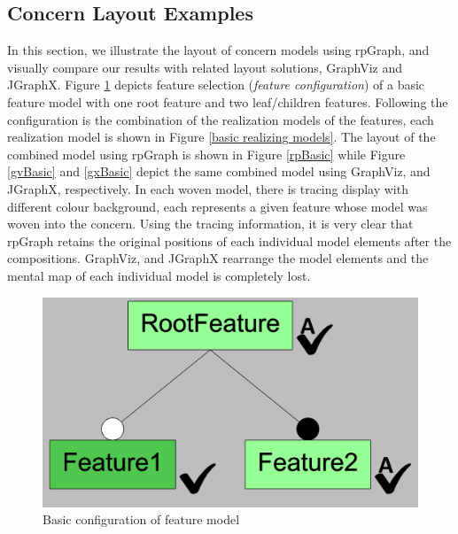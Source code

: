 \subsection{Concern Layout Examples}
In this section, we illustrate the layout of concern models using rpGraph, and visually compare our results with related layout solutions,  GraphViz and JGraphX. Figure \ref{basicConfig} depicts feature selection (\textit{feature configuration}) of a basic feature model with one root feature and two leaf/children features. Following the configuration is the combination of the realization models of the features, each realization model is shown in Figure \ref{basic realizing models}. The layout of the combined model using rpGraph is shown in Figure \ref{rpBasic} while Figure \ref{gvBasic} and \ref{gxBasic} depict the same combined model using GraphViz, and JGraphX, respectively.  In each woven model, there is tracing display with different colour background, each represents a given feature whose model was woven into the concern. Using the tracing information, it is very clear that rpGraph retains the original positions of each individual model elements after the compositions. GraphViz, and JGraphX rearrange the model elements and the mental map of each individual model is completely lost.
\begin{figure}
	\centering
    \includegraphics[width=1\linewidth]{exfm.PNG}
	\caption{Basic configuration of feature model}
    \label{basicConfig}
\end{figure}
